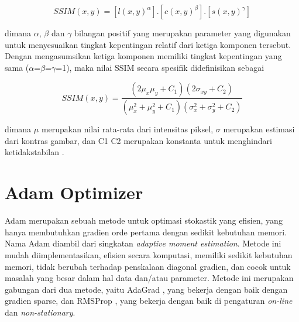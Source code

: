 \begin{equation}
  \label{eq:ssim1}
  SSIM(x,y) =  [l(x,y)^{ \alpha } ] . [c(x,y)^{ \beta }].[s(x,y)^{ \gamma }]
\end{equation}

dimana $\alpha$, $\beta$ dan $\gamma$ bilangan positif yang merupakan parameter yang digunakan untuk menyesuaikan tingkat kepentingan relatif dari ketiga komponen tersebut. 
Dengan mengasumsikan ketiga komponen memiliki tingkat kepentingan yang sama ($\alpha$=$\beta$=$\gamma$=1), maka nilai SSIM secara spesifik didefinisikan sebagai 

\begin{equation}
  \label{eq:ssim2}
  SSIM(x,y) =  \frac{(2  \mu_{x} \mu_{y} + C_{1})(2 \sigma_{xy} + C_{2} )}{(\mu_{x}^{2}  + \mu_{y}^{2}+C_{1})(\sigma_{x}^{2}+\sigma_{y}^{2}+C_{2})} 
\end{equation}

dimana $\mu$ merupakan nilai rata-rata dari intensitas piksel, $\sigma$ merupakan estimasi dari kontras gambar, dan C1 C2 merupakan konstanta untuk menghindari ketidakstabilan \parencite{SSIM}.

\section{Adam Optimizer}
\label{adamOptimizer}

Adam merupakan sebuah metode untuk optimasi stokastik yang efisien, yang hanya membutuhkan gradien orde pertama dengan sedikit kebutuhan memori. 
Nama Adam diambil dari singkatan \emph{adaptive moment estimation}. 
Metode ini mudah diimplementasikan, efisien secara komputasi, memiliki sedikit kebutuhan memori, tidak berubah terhadap penskalaan diagonal gradien, dan cocok untuk masalah yang besar dalam hal data dan/atau parameter. 
Metode ini merupakan gabungan dari dua metode, yaitu AdaGrad \parencite{adaGrad}, yang bekerja dengan baik dengan gradien sparse, 
dan RMSProp \parencite{RMSProp}, yang bekerja dengan baik di pengaturan \emph{on-line} dan \emph{non-stationary}\parencite{adam}.